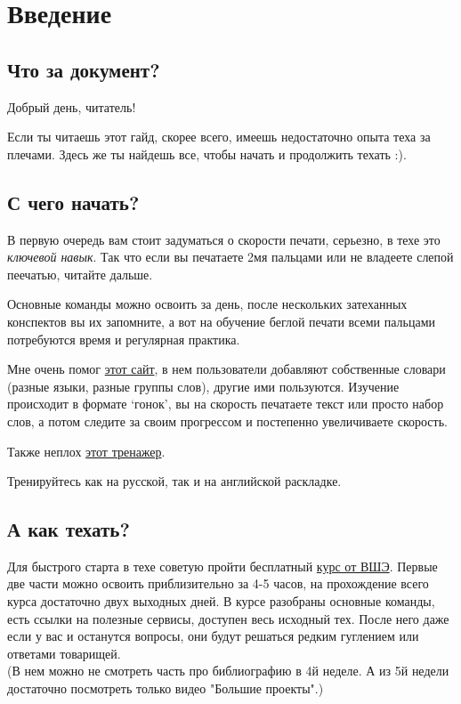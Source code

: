 \section{Введение}
\subsection{Что за документ?}

Добрый день, читатель!

Если ты читаешь этот гайд, скорее всего, имеешь недостаточно опыта теха за плечами. 
Здесь же ты найдешь все, чтобы начать и продолжить техать :).

\subsection{С чего начать?}

В первую очередь вам стоит задуматься о скорости печати, серьезно, в техе это \textit{ключевой навык}. Так что если вы печатаете 2мя пальцами или не владеете слепой пеечатью, читайте дальше.

Основные команды можно освоить за день, после нескольких затеханных конспектов вы их запомните, а вот на обучение беглой печати всеми пальцами потребуются время и регулярная практика.

Мне очень помог \href{http://klavogonki.ru/}{этот сайт}, в нем пользователи добавляют собственные словари (разные языки, разные группы слов), другие ими пользуются. 
Изучение происходит в формате `гонок', вы на скорость печатаете текст или просто набор слов, а потом следите за своим прогрессом и постепенно увеличиваете скорость.

Также неплох \href{https://www.ratatype.com}{этот тренажер}.

Тренируйтесь как на русской, так и на английской раскладке.

\subsection{А как техать?}
Для быстрого старта в техе советую пройти бесплатный \href{https://www.coursera.org/learn/latex}{курс от ВШЭ}. Первые две части можно освоить приблизительно за 4-5 часов, на прохождение всего курса достаточно двух выходных дней. В курсе разобраны основные команды, есть ссылки на полезные сервисы, доступен весь исходный тех. После него даже если у вас и останутся вопросы, они будут решаться редким гуглением или ответами товарищей. 
\\
(В нем можно не смотреть часть про библиографию в 4й неделе. А из 5й недели достаточно посмотреть только видео "Большие проекты".)


